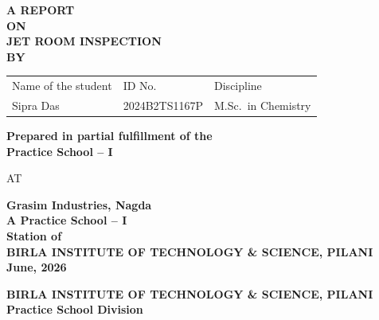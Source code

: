 \documentclass{book}
\begin{document}


\thispagestyle{empty}

\vspace*{1cm}
\begin{center}
  {\bf\Large A REPORT}\\[0.3cm]
  {\bf\Large ON}\\[0.3cm]
  {\bf\Large JET ROOM INSPECTION}\\[2cm]

  {\bf BY}\\[1cm]

  \begin{tabular}{lll}
    Name of the student & \hspace{2cm} ID No. & \hspace{2cm} Discipline \\[4pt]
    Sipra Das & \hspace{2cm} 2024B2TS1167P & \hspace{2cm} M.Sc.\ in Chemistry \\
  \end{tabular}

  \vspace{2cm}
  {\bf Prepared in partial fulfillment of the\\
  Practice School -- I}

  \vspace{0.5cm}
  AT

  \vspace{1cm}
  {\bf Grasim Industries, Nagda}\\[0.2cm]
  {\bf A Practice School -- I}\\[0.2cm]
  {\bf Station of}\\[0.5cm]


  {\bf BIRLA INSTITUTE OF TECHNOLOGY \& SCIENCE, PILANI}\\[0.5cm]
  {\bf June, 2026}
\end{center}

\newpage

\thispagestyle{empty}

\begin{center}
  {\bf BIRLA INSTITUTE OF TECHNOLOGY \& SCIENCE, PILANI}\\[0.2cm]
  {\bf Practice School Division}
\end{center}
\end{document}
